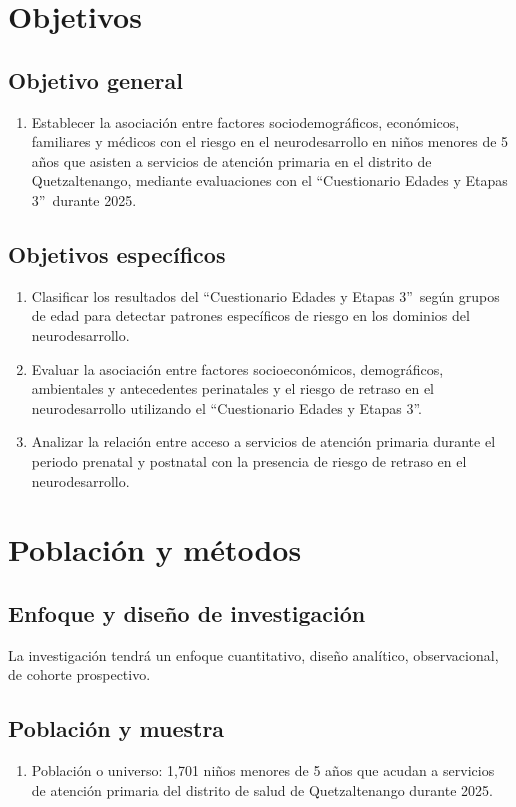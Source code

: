 \documentclass[11pt,letterpaper]{report}
\newcommand{\tiempito}{marzo a junio de 2025}
\newcommand{\muestradeseada}{1,697}
\newcommand{\asq}{“Cuestionario Edades y Etapas 3”}
\begin{document}
\chapter{Objetivos}
\section{Objetivo general}
\begin{enumerate}
	\item Establecer la asociación entre factores sociodemográficos,
	económicos, familiares y médicos con el riesgo en el neurodesarrollo en
	niños menores de 5 años que asisten a servicios de atención primaria en el
	distrito de Quetzaltenango, mediante evaluaciones con el \asq\ durante
	2025.
\end{enumerate}
\section{Objetivos específicos}
\begin{enumerate}
	\item Clasificar los resultados del \asq\ según grupos de edad para
	detectar patrones específicos de riesgo en los dominios del
	neurodesarrollo. 
	\item Evaluar la asociación entre factores socioeconómicos, demográficos,
	ambientales y antecedentes perinatales y el riesgo de retraso en el
	neurodesarrollo utilizando el \asq.
	\item Analizar la relación entre acceso a servicios de atención primaria
	durante el periodo prenatal y postnatal con la presencia de riesgo de
	retraso en el neurodesarrollo.
\end{enumerate}

\chapter{Población y métodos}
\section{Enfoque y diseño de investigación}
La investigación tendrá un enfoque cuantitativo, diseño analítico,
observacional, de cohorte prospectivo.

\section{Población y muestra}

\begin{enumerate}
	\item Población o universo:
	1,701 niños menores de 5 años que acudan a servicios de atención primaria
	del distrito de salud de Quetzaltenango durante 2025.
\end{enumerate}
\end{document}
